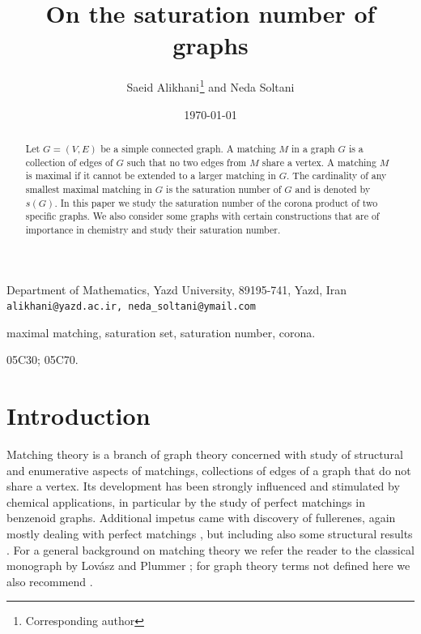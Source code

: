 \documentclass[11pt]{article}
\begin{document}
\title{On the saturation number of graphs}

\author{Saeid Alikhani$^{}$\footnote{Corresponding author} and Neda Soltani}

\date{\today}

\maketitle

\begin{center}

Department of Mathematics, Yazd University, 89195-741, Yazd, Iran\\
{\tt alikhani@yazd.ac.ir, neda\_soltani@ymail.com }\\

\end{center}


\begin{abstract}
Let $G=(V,E)$ be a simple connected graph. A matching $M$ in a graph $G$ is a collection of edges of $G$ such that no 
two edges from $M$ share a vertex. A matching $M$ is maximal if it cannot be extended to a larger matching in $G$. The cardinality of any smallest maximal matching in $G$ is the saturation number of $G$ and is denoted by $s(G)$. 
In this paper we study the saturation number of the corona product of two specific graphs. We also consider some 
graphs with certain constructions that are of importance in chemistry and study their saturation number. 
   
\end{abstract}

  maximal matching, saturation set, saturation number, corona.

\medskip
{} 05C30; 05C70.


\section{Introduction}

Matching theory is a branch of graph theory concerned with study of structural and enumerative aspects of matchings, collections of edges of a graph that do not share a vertex. Its development has been strongly influenced and stimulated by chemical applications, in particular by the study of perfect matchings in benzenoid graphs. Additional impetus came with discovery of fullerenes, again mostly dealing with perfect matchings \cite{Ful, Sli, Kar, Zha}, but including also some structural results \cite{Ves, Sat}. For a general background on matching theory we refer the reader to the classical monograph by Lov\'asz and Plummer \cite{Lov}; for graph theory terms not defined here we also recommend \cite{Wes}.
\end{document}
